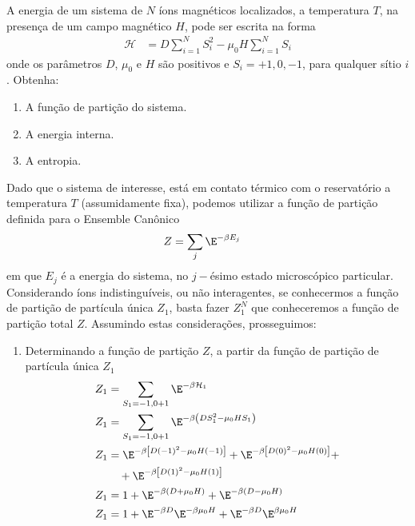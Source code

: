 \begin{prob}
  A energia de um sistema de $N$ íons magnéticos localizados, a temperatura $T$, na presença de um campo magnético $H$, pode ser escrita na forma
  \begin{align}
    \mathcal{H}&=D\sum_{i=1}^NS_i^2-\mu_0H\sum_{i=1}^NS_i
  \end{align}
  onde os parâmetros $D$, $\mu_0$ e $H$ são positivos e $S_i=+1,0,-1$, para qualquer sítio $i$. Obtenha:
  \begin{enumerate}[label=\alph *)]
    \item A função de partição do sistema.
    \item A energia interna.
    \item A entropia.
  \end{enumerate}
  \begin{sol}
    Dado que o sistema de interesse, está em contato térmico com o reservatório a temperatura $T$ (assumidamente fixa), podemos utilizar a função de partição definida para o Ensemble Canônico
    \begin{align}
      Z&=\sum_j\E^{-\beta E_j}
    \end{align}
    em que $E_j$ é a energia do sistema, no $j-$ésimo estado microscópico particular. Considerando íons indistinguíveis, ou não interagentes, se conhecermos a função de partição de partícula única $Z_1$, basta fazer $Z_1^N$ que conheceremos a função de partição total $Z$. Assumindo estas considerações, prosseguimos:
    \begin{enumerate}[label=\alph *)]
      \item Determinando a função de partição $Z$, a partir da função de partição de partícula única $Z_1$
      \begin{align}
        \begin{split}
          Z_1&=\sum_{S_1=-1,0+1}\E^{-\beta\mathcal{H}_1}\\
          Z_1&=\sum_{S_1=-1,0+1}\E^{-\beta\left(DS_1^{2}-\mu_0HS_1\right)}\\
          Z_1&=\E^{-\beta\left[D(-1)^2-\mu_0H(-1)\right]}+\E^{-\beta\left[D(0)^2-\mu_0H(0)\right]}+\\
          &\quad+\E^{-\beta\left[D(1)^2-\mu_0H(1)\right]}\\
          Z_1&=1+\E^{-\beta\left(D+\mu_0H\right)}+\E^{-\beta\left(D-\mu_0H\right)}\\
          Z_1&=1+\E^{-\beta D}\E^{-\beta\mu_0H}+\E^{-\beta D}\E^{\beta\mu_0H}\\

\end{split}
\end{align}
\end{enumerate}
\end{sol}
\end{prob}
